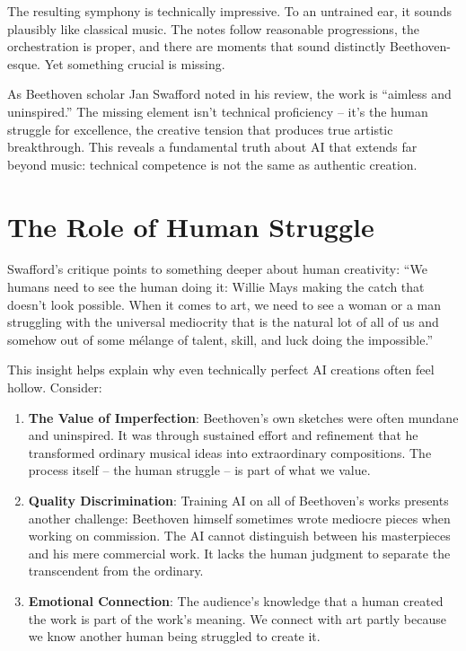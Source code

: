 \documentclass[
  Letterpaper,
]{scrbook}
\begin{document}
The resulting symphony is technically impressive. To an untrained ear,
it sounds plausibly like classical music. The notes follow reasonable
progressions, the orchestration is proper, and there are moments that
sound distinctly Beethoven-esque. Yet something crucial is missing.

As Beethoven scholar Jan Swafford noted in his review, the work is
``aimless and uninspired.'' The missing element isn't technical
proficiency -- it's the human struggle for excellence, the creative
tension that produces true artistic breakthrough. This reveals a
fundamental truth about AI that extends far beyond music: technical
competence is not the same as authentic creation.

\section{The Role of Human Struggle}\label{the-role-of-human-struggle}

Swafford's critique points to something deeper about human creativity:
``We humans need to see the human doing it: Willie Mays making the catch
that doesn't look possible. When it comes to art, we need to see a woman
or a man struggling with the universal mediocrity that is the natural
lot of all of us and somehow out of some mélange of talent, skill, and
luck doing the impossible.''

This insight helps explain why even technically perfect AI creations
often feel hollow. Consider:

\begin{enumerate}
\def\labelenumi{\arabic{enumi}.}
\item
  \textbf{The Value of Imperfection}: Beethoven's own sketches were
  often mundane and uninspired. It was through sustained effort and
  refinement that he transformed ordinary musical ideas into
  extraordinary compositions. The process itself -- the human struggle
  -- is part of what we value.
\item
  \textbf{Quality Discrimination}: Training AI on all of Beethoven's
  works presents another challenge: Beethoven himself sometimes wrote
  mediocre pieces when working on commission. The AI cannot distinguish
  between his masterpieces and his mere commercial work. It lacks the
  human judgment to separate the transcendent from the ordinary.
\item
  \textbf{Emotional Connection}: The audience's knowledge that a human
  created the work is part of the work's meaning. We connect with art
  partly because we know another human being struggled to create it.
\end{enumerate}
\end{document}

